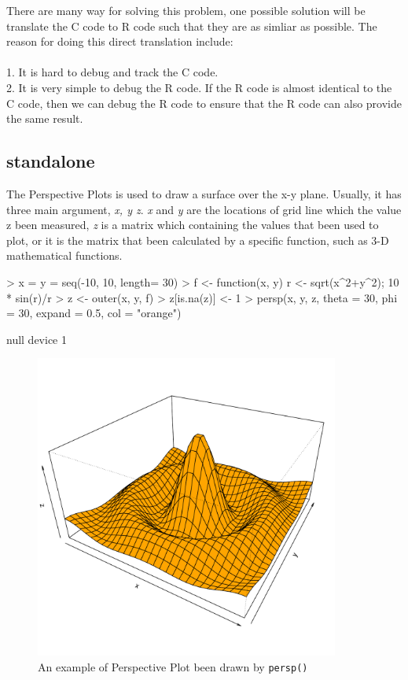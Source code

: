 \documentclass[a4paper,10pt]{article}
\begin{document}
There are many way for solving this problem, one possible solution will be translate the C code to R code such that they are as simliar as possible. The reason for doing this direct translation include: \\\\
1. It is hard to debug and track the C code. \\
2. It is very simple to debug the R code. If the R code is almost identical to the C code, then we can debug the R code to ensure that the R code can also provide the same result. \\

\subsection{standalone}
The Perspective Plots is used to draw a surface over the x-y plane. Usually, it has three main argument, \emph{x, y z}. \emph{x} and \emph{y} are the locations of grid line which the value z been measured, \emph{z} is a matrix which containing the values that been used to plot, or it is the matrix that been calculated by a specific function, such as 3-D mathematical functions.


\begin{Schunk}
\begin{Sinput}
> x = y = seq(-10, 10, length= 30)
> f <- function(x, y) { r <- sqrt(x^2+y^2); 10 * sin(r)/r }
> z <- outer(x, y, f)
> z[is.na(z)] <- 1
> persp(x, y, z, theta = 30, phi = 30, expand = 0.5, col = "orange")
\end{Sinput}
\end{Schunk}

\begin{Schunk}
\begin{Soutput}
null device 
          1 
\end{Soutput}
\end{Schunk}

\begin{figure}[h]
\begin{center}
  \includegraphics[height = 10cm, width = 10cm]{figure/standalone_1}
  \caption{An example of Perspective Plot been drawn by \texttt{persp()}}
  	\label{figure5}
\end{center}
\end{figure}
\end{document}
